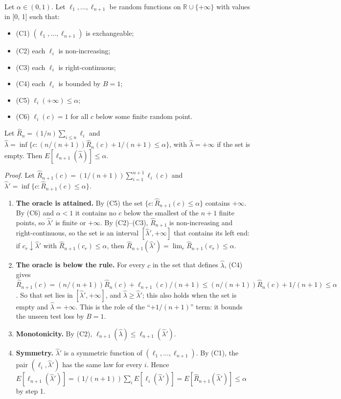 \documentclass{ieeeaccess}
\begin{document}
Let $\alpha \in (0, 1)$. Let $\ell_{1}, \dots, \ell_{n+1}$ be random functions on $\mathbb{R} \cup \{+\infty\}$ with values in [0, 1] such that:

\begin{itemize}
\item (C1) $(\ell_{1}, \dots, \ell_{n+1})$ is exchangeable;
\item (C2) each $\ell_{i}$ is non-increasing;
\item (C3) each $\ell_{i}$ is right-continuous;
\item (C4) each $\ell_{i}$ is bounded by $B = 1$;
\item (C5) $\ell_{i}(+\infty) \leq \alpha$;
\item (C6) $\ell_{i}(c) = 1$ for all $c$ below some finite random point.
\end{itemize}

Let $\hat{R}_{n} = (1/n)\sum_{i\leq n}\ell_{i}$ and $\hat{\lambda} = \inf\{c : (n/(n + 1))\hat{R}_{n}(c) + 1/(n + 1) \leq \alpha\}$, with $\hat{\lambda} = +\infty$ if the set is empty. Then $E[\ell_{n+1}(\hat{\lambda})] \leq \alpha$.

\emph{Proof.} Let $\hat{R}_{n+1}(c) = (1/(n + 1))\sum_{i=1}^{n+1}\ell_{i}(c)$ and $\hat{\lambda}' = \inf\{c : \hat{R}_{n+1}(c) \leq \alpha\}$.

\begin{enumerate}
\item[1.] \textbf{The oracle is attained.} By (C5) the set $\{c : \hat{R}_{n+1}(c) \leq \alpha\}$ contains $+\infty$. By (C6) and $\alpha < 1$ it contains no $c$ below the smallest of the $n + 1$ finite points, so $\hat{\lambda}'$ is finite or $+\infty$. By (C2)--(C3), $\hat{R}_{n+1}$ is non-increasing and right-continuous, so the set is an interval $[\hat{\lambda}', +\infty]$ that contains its left end: if $c_{r} \downarrow \hat{\lambda}'$ with $\hat{R}_{n+1}(c_{r}) \leq \alpha$, then $\hat{R}_{n+1}(\hat{\lambda}') = \lim_{r} \hat{R}_{n+1}(c_{r}) \leq \alpha$.
\item[2.] \textbf{The oracle is below the rule.} For every $c$ in the set that defines $\hat{\lambda}$, (C4) gives $\hat{R}_{n+1}(c) = (n/(n + 1))\hat{R}_{n}(c) + \ell_{n+1}(c)/(n + 1) \leq (n/(n + 1))\hat{R}_{n}(c) + 1/(n + 1) \leq \alpha$. So that set lies in $[\hat{\lambda}', +\infty]$, and $\hat{\lambda} \geq \hat{\lambda}'$; this also holds when the set is empty and $\hat{\lambda} = +\infty$. This is the role of the ``$+ 1/(n + 1)$'' term: it bounds the unseen test loss by $B = 1$.
\item[3.] \textbf{Monotonicity.} By (C2), $\ell_{n+1}(\hat{\lambda}) \leq \ell_{n+1}(\hat{\lambda}')$.
\item[4.] \textbf{Symmetry.} $\hat{\lambda}'$ is a symmetric function of $(\ell_{1}, \dots, \ell_{n+1})$. By (C1), the pair $(\ell_{i}, \hat{\lambda}')$ has the same law for every $i$. Hence $E[\ell_{n+1}(\hat{\lambda}')] = (1/(n + 1))\sum_{i} E[\ell_{i}(\hat{\lambda}')] = E[\hat{R}_{n+1}(\hat{\lambda}')] \leq \alpha$ by step 1.
\end{enumerate}
\end{document}
